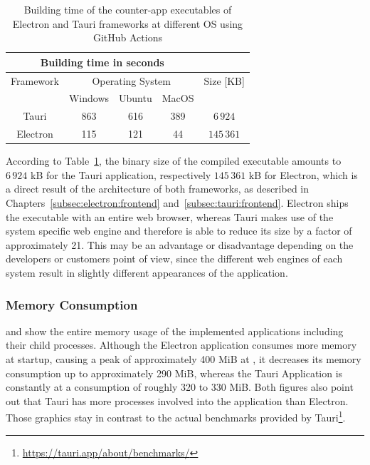 \begin{table}[ht]
    \begin{tabular} {| c | c | c | c | c |}
        \hline
        \multicolumn{4}{|c|}{Building time in seconds} & \\ \hline
        Framework & \multicolumn{3}{|c|}{Operating System} & Size [KB]  \\ \hline
        & Windows & Ubuntu & MacOS &  \\ \hline
        Tauri & 863 & 616 & 389 & $6\,924$  \\ \hline
        Electron & 115 & 121 & 44 & $145\,361$ \\ \hline
    \end{tabular}
    \caption{\label{table:buildingtime} Building time of the counter-app executables of Electron and Tauri frameworks at different \ac{OS} using GitHub Actions}
\end{table}

According to Table~\ref{table:buildingtime}, the binary size of the compiled executable amounts to $6\,924$ kB for the Tauri application, respectively $145\,361$ kB for Electron, which is a direct result of the architecture of both frameworks, as described in Chapters~\ref{subsec:electron:frontend} and~\ref{subsec:tauri:frontend}.
Electron ships the executable with an entire web browser, whereas Tauri makes use of the system specific web engine and therefore is able to reduce its size by a factor of approximately 21.
This may be an advantage or disadvantage depending on the developers or customers point of view, since the different web engines of each system result in slightly different appearances of the application.

\subsubsection{Memory Consumption}
\label{subsubsec:perf:memory}
 and  show the entire memory usage of the implemented applications including their child processes.
Although the Electron application consumes more memory at startup, causing a peak of approximately 400 MiB at , it decreases its memory consumption up to approximately 290 MiB,
whereas the Tauri Application is constantly at a consumption of roughly 320 to 330 MiB\@.
Both figures also point out that Tauri has more processes involved into the application than Electron.
Those graphics stay in contrast to the actual benchmarks provided by Tauri\footnote{\url{https://tauri.app/about/benchmarks/}}.


